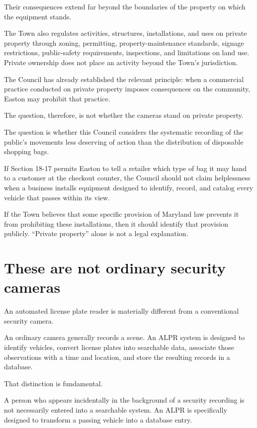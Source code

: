 \documentclass[11pt]{article}
\begin{document}
Their consequences extend far beyond the boundaries of the property on which the equipment stands.

The Town also regulates activities, structures, installations, and uses on private property through zoning, permitting, property-maintenance standards, signage restrictions, public-safety requirements, inspections, and limitations on land use. Private ownership does not place an activity beyond the Town’s jurisdiction.

The Council has already established the relevant principle: when a commercial practice conducted on private property imposes consequences on the community, Easton may prohibit that practice.

The question, therefore, is not whether the cameras stand on private property.

The question is whether this Council considers the systematic recording of the public’s movements less deserving of action than the distribution of disposable shopping bags.

If Section 18-17 permits Easton to tell a retailer which type of bag it may hand to a customer at the checkout counter, the Council should not claim helplessness when a business installs equipment designed to identify, record, and catalog every vehicle that passes within its view.

If the Town believes that some specific provision of Maryland law prevents it from prohibiting these installations, then it should identify that provision publicly. “Private property” alone is not a legal explanation.

\section*{These are not ordinary security cameras}
\label{sec:org1073d6c}

An automated license plate reader is materially different from a conventional security camera.

An ordinary camera generally records a scene. An ALPR system is designed to identify vehicles, convert license plates into searchable data, associate those observations with a time and location, and store the resulting records in a database.

That distinction is fundamental.

A person who appears incidentally in the background of a security recording is not necessarily entered into a searchable system. An ALPR is specifically designed to transform a passing vehicle into a database entry.
\end{document}
